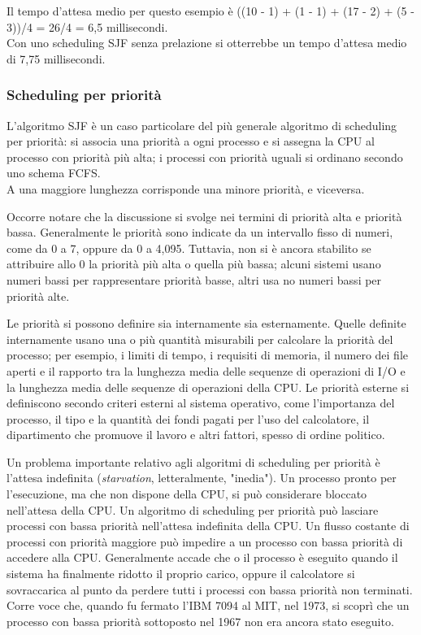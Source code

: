 \documentclass[11pt,a4paper]{article}
\begin{document}
Il tempo d'attesa medio per questo esempio è
((10 - 1) + (1 - 1) + (17 - 2) + (5 - 3))/4 = 26/4 = 6,5 millisecondi.\\
Con uno scheduling
SJF senza prelazione si otterrebbe un tempo d'attesa medio di 7,75 millisecondi.\\

\subsubsection{Scheduling per priorità}
L'algoritmo SJF è un caso particolare del più generale algoritmo di scheduling per priorità:
si associa una priorità a ogni processo e si assegna la CPU al processo con priorità più alta; i
processi con priorità uguali si ordinano secondo uno schema FCFS.\\
A una maggiore lunghezza corrispon­de una minore priorità, e viceversa.

Occorre notare che la discussione si svolge nei termini di priorità alta e priorità bassa.
Generalmente le priorità sono indicate da un intervallo fisso di numeri, come da 0 a 7, oppure da 0 a 4,095. Tuttavia, non si è ancora stabilito se attribuire allo 0 la priorità più alta o
quella più bassa; alcuni sistemi usano numeri bassi per rappresentare priorità basse, altri usa­
no numeri bassi per priorità alte.

Le priorità si possono definire sia internamente sia esternamente. Quelle definite in­ternamente usano una o più quantità misurabili per calcolare la priorità del processo; per
esempio, i limiti di tempo, i requisiti di memoria, il numero dei file aperti e il rapporto tra
la lunghezza media delle sequenze di operazioni di I/O e la lunghezza media delle sequenze
di operazioni della CPU. Le priorità esterne si definiscono secondo criteri esterni al sistema
operativo, come l'importanza del processo, il tipo e la quantità dei fondi pagati per l'uso del
calcolatore, il dipartimento che promuove il lavoro e altri fattori, spesso di ordine politico.

Un problema importante relativo agli algoritmi di scheduling per priorità è l'attesa in­definita (\emph{starvation}, letteralmente, "inedia"). Un processo pronto per l'esecuzione, ma che
non dispone della CPU, si può considerare bloccato nell'attesa della CPU. Un algoritmo di
scheduling per priorità può lasciare processi con bassa priorità nell'attesa indefinita della
CPU. Un flusso costante di processi con priorità maggiore può impedire a un processo con
bassa priorità di accedere alla CPU. Generalmente accade che o il processo è eseguito quando il sistema ha finalmente ridotto il proprio carico, op­pure il calcolatore si sovraccarica al punto da perdere tutti i processi con bassa priorità non
terminati. Corre voce che, quando fu fermato l'IBM 7094 al MIT, nel 1973, si scoprì che un
processo con bassa priorità sottoposto nel 1967 non era ancora stato eseguito.
\end{document}
